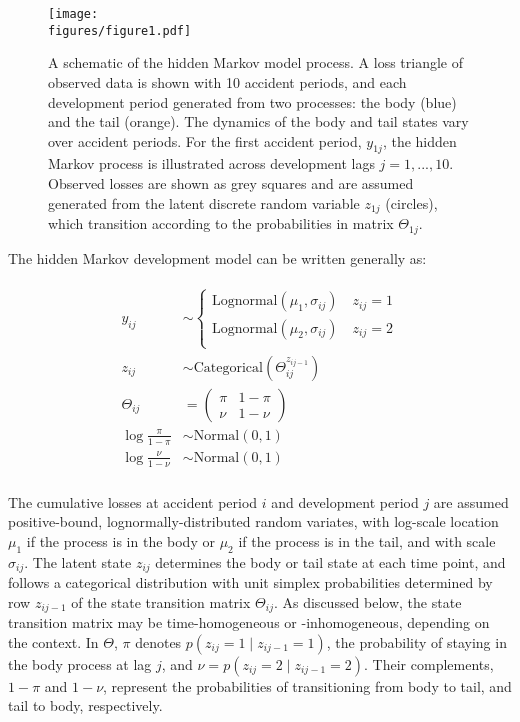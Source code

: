 \begin{figure}[t!]
    \centering
    \texttt{[image: \\figures/figure1.pdf]}
    \caption{
        A schematic of the hidden Markov model process.
        A loss triangle of observed data is shown
        with 10 accident periods, and each
        development period generated from
        two processes: the body (blue)
        and the tail (orange). The dynamics of the
        body and tail states vary over accident periods.
        For the first accident period, $y_{1j}$,
        the hidden Markov process is illustrated
        across development lags $j = 1, ..., 10$.
        Observed losses are shown as grey
        squares and are assumed generated from the latent
        discrete random variable $z_{1j}$ (circles), 
        which transition according to the probabilities
        in matrix $\Theta_{1j}$.
    }
	\label{fig:schematic}
\end{figure}

The hidden Markov development model can be
written generally as:

\begin{align}
	\begin{split}
	\label{eq:hmm}
	y_{ij} &\sim \begin{cases}
		\mathrm{Lognormal}(\mu_{1}, \sigma_{ij}) \quad z_{ij} = 1\\
		\mathrm{Lognormal}(\mu_{2}, \sigma_{ij}) \quad z_{ij} = 2\\
	\end{cases}\\
    z_{ij} &\sim \mathrm{Categorical}(\Theta^{z_{ij-1}}_{ij})\\
    \Theta_{ij} &= \begin{pmatrix}
        \pi & 1 - \pi\\
        \nu & 1 - \nu
    \end{pmatrix}\\
    \log \frac{\pi}{1 - \pi} &\sim \mathrm{Normal}(0, 1)\\
    \log \frac{\nu}{1 - \nu} &\sim \mathrm{Normal}(0, 1)\\
	\end{split}
\end{align}

The cumulative losses at accident period $i$ and development period $j$
are assumed positive-bound, lognormally-distributed random variates,
with log-scale location $\mu_{1}$ if the process is in the body
or $\mu_{2}$ if the process is in the tail, and with scale $\sigma_{ij}$.
The latent state $z_{ij}$ determines the body or tail state at each
time point, and follows a categorical distribution with unit simplex probabilities
determined by row $z_{ij - 1}$ of the state transition matrix
$\Theta_{ij}$. As discussed below, the state transition matrix
may be time-homogeneous or -inhomogeneous, depending on the context.
In $\Theta$, $\pi$ denotes $p(z_{ij} = 1 \mid z_{ij-1} = 1)$, the 
probability of staying in the body
process at lag $j$, and $\nu = p(z_{ij} = 2 \mid z_{ij-1} = 2)$.
Their complements, $1 - \pi$ and $1 - \nu$, represent the
probabilities of transitioning from body to tail, and tail
to body, respectively.

